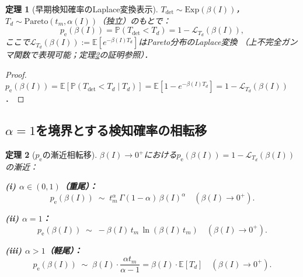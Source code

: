 \documentclass[12pt,a4paper]{article}
\theoremstyle{plain}
\newtheorem{theorem}{定理}[section]
\theoremstyle{definition}
\theoremstyle{remark}
\newcommand{\E}{\mathbb{E}}
\newcommand{\Prob}{\mathbb{P}}
\newcommand{\calL}{\mathcal{L}}
\newcommand{\pe}{p_{\mathrm{e}}}
\newcommand{\Tdet}{T_{\mathrm{det}}}
\newcommand{\betaI}{\beta(I)}
\newcommand{\alphI}{\alpha(I)}
\begin{document}
\begin{theorem}[早期検知確率のLaplace変換表示]\label{thm:pe_laplace}
$\Tdet\sim\mathrm{Exp}(\betaI)$，$T_d\sim\mathrm{Pareto}(t_m,\alphI)$（独立）のもとで：
\begin{equation}\label{eq:pe_formula}
  \pe(\betaI) = \Prob(\Tdet<T_d) = 1-\calL_{T_d}(\betaI),
\end{equation}
ここで$\calL_{T_d}(\betaI):=\E[e^{-\betaI T_d}]$はPareto分布のLaplace変換
（上不完全ガンマ関数で表現可能；定理\ref{thm:phase_pe}の証明参照）．
\end{theorem}

\begin{proof}
$\pe(\betaI)=\E[\Prob(\Tdet<T_d\mid T_d)]=\E[1-e^{-\betaI T_d}]=1-\calL_{T_d}(\betaI)$．
\end{proof}

\subsection{$\alpha=1$を境界とする検知確率の相転移}

\begin{theorem}[$\pe$の漸近相転移]\label{thm:phase_pe}
$\betaI\to0^+$における$\pe(\betaI)=1-\calL_{T_d}(\betaI)$の漸近：

\noindent\textbf{(i) $\alpha\in(0,1)$（重尾）：}
\begin{equation}\label{eq:pe_sub}
  \pe(\betaI)\;\sim\; t_m^{\alpha}\,\Gamma(1-\alpha)\,\betaI^{\alpha}
  \quad(\betaI\to0^+).
\end{equation}

\noindent\textbf{(ii) $\alpha=1$：}
\begin{equation}\label{eq:pe_1}
  \pe(\betaI)\;\sim\; -\betaI\,t_m\,\ln(\betaI\,t_m)
  \quad(\betaI\to0^+).
\end{equation}

\noindent\textbf{(iii) $\alpha>1$（軽尾）：}
\begin{equation}\label{eq:pe_lin}
  \pe(\betaI)\;\sim\; \betaI\cdot\frac{\alpha t_m}{\alpha-1}
  = \betaI\cdot\E[T_d]
  \quad(\betaI\to0^+).
\end{equation}
\end{theorem}
\end{document}
